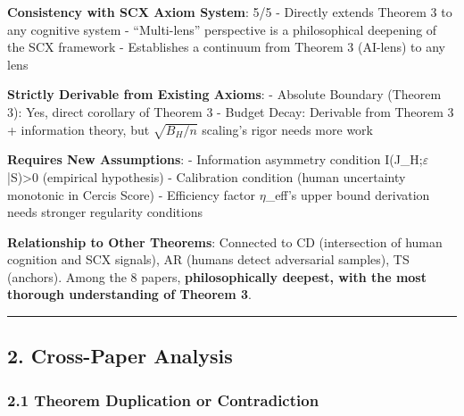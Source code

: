 \documentclass[
  12pt,
]{article}
\begin{document}
\textbf{Consistency with SCX Axiom System}: 5/5
- Directly extends Theorem 3 to any cognitive system
- ``Multi-lens'' perspective is a philosophical deepening of the SCX framework
- Establishes a continuum from Theorem 3 (AI-lens) to any lens

\textbf{Strictly Derivable from Existing Axioms}:
- Absolute Boundary (Theorem 3): Yes, direct corollary of Theorem 3
- Budget Decay: Derivable from Theorem 3 + information theory, but $\sqrt{B_H/n}$ scaling's rigor needs more work

\textbf{Requires New Assumptions}:
- Information asymmetry condition I(J\_H;$\varepsilon$|S)>0 (empirical hypothesis)
- Calibration condition (human uncertainty monotonic in Cercis Score)
- Efficiency factor $\eta$\_eff's upper bound derivation needs stronger regularity conditions

\textbf{Relationship to Other Theorems}: Connected to CD (intersection of human cognition and SCX signals), AR (humans detect adversarial samples), TS (anchors). Among the 8 papers, \textbf{philosophically deepest, with the most thorough understanding of Theorem 3}.

\begin{center}\rule{0.5\linewidth}{0.5pt}\end{center}

\subsection{2. Cross-Paper Analysis}\label{cross-paper-analysis}

\subsubsection{2.1 Theorem Duplication or Contradiction}\label{theorem-duplication}
\end{document}
